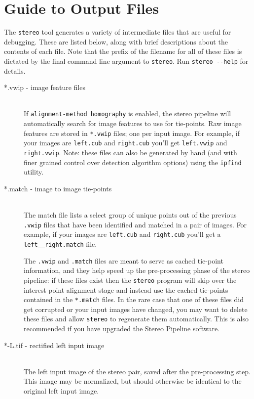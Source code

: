 \chapter{Guide to Output Files}
\label{chapter:outputfiles}

The {\tt stereo} tool generates a variety of intermediate files that
are useful for debugging.  These are listed below, along with brief
descriptions about the contents of each file.  Note that the prefix of
the filename for all of these files is dictated by the final command
line argument to {\tt stereo}.  Run {\tt stereo -\/-help} for details.

\begin{description}

\item[*.vwip \textnormal{- image feature files}] \hfill \\
  If \texttt{alignment-method homography} is enabled, the stereo
  pipeline will automatically search for image features to use for
  tie-points.  Raw image features are stored in \texttt{*.vwip} files;
  one per input image. For example, if your images are
  \texttt{left.cub} and \texttt{right.cub} you'll get
  \texttt{left.vwip} and \texttt{right.vwip}.  Note: these files can
  also be generated by hand (and with finer grained control over
  detection algorithm options) using the {\tt ipfind} utility.

\item[*.match \textnormal{- image to image tie-points}] \hfill \\ 
  The match file lists a select group of unique points out of the
  previous \texttt{.vwip} files that have been identified and matched
  in a pair of images.  For example, if your images are
  \texttt{left.cub} and \texttt{right.cub} you'll get a
  \texttt{left\_\_right.match} file.  

  The \texttt{.vwip} and \texttt{.match} files are meant to serve
  as cached tie-point information, and they help speed up the
  pre-processing phase of the stereo pipeline: if these files exist
  then the \texttt{stereo} program will skip over the interest point
  alignment stage and instead use the cached tie-points contained
  in the \texttt{*.match} files.  In the rare case that one of these files
  did get corrupted or your input images have changed, you may want
  to delete these files and allow {\tt stereo} to regenerate them
  automatically.  This is also recommended if you have upgraded the
  Stereo Pipeline software.

\item[*-L.tif - \textnormal{rectified left input image}] \hfill \\ 
  The left input image of the stereo pair, saved after the
  pre-processing step.  This image may be normalized, but should
  otherwise be identical to the original left input image.


\end{description}
